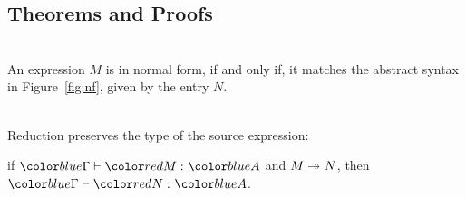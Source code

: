 \subsection{Theorems and Proofs}

\begin{proposition}\ \\
\label{prop_normal}
An expression $M$ is in normal form, if and only if, it matches the
abstract syntax in Figure~\ref{fig:nf}, given by the entry $N$.
\end{proposition}


\begin{proposition}[Preservation]\ \\
\label{prop_preservation}
Reduction preserves the type of the source expression:

 if $\env \vdash \typing{M}{A}$ and $M \twoheadrightarrow_{} N$, then
$\env \vdash \typing{N}{A}$.
\end{proposition}
